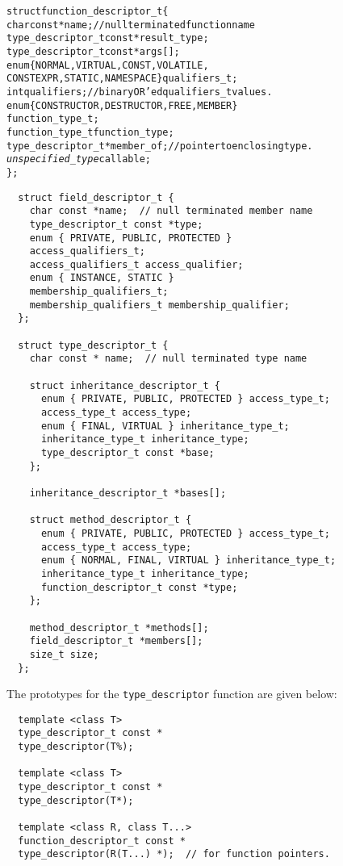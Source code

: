 \documentclass[10pt,a4paper]{article}
\begin{document}
\begin{alltt}
  struct function\_descriptor\_t \{
    char const *name;  // null terminated function name
    type\_descriptor\_t const *result\_type;
    type\_descriptor\_t const *args[];
    enum \{ NORMAL, VIRTUAL, CONST, VOLATILE,
           CONSTEXPR, STATIC, NAMESPACE \} qualifiers\_t;
    int qualifiers;  // binary OR’ed qualifiers\_t values.
    enum \{ CONSTRUCTOR, DESTRUCTOR, FREE, MEMBER \}
    function\_type\_t;
    function\_type\_t function\_type;
    type\_descriptor\_t *member\_of;  // pointer to enclosing type.
    \emph{unspecified\_type} callable;
  \};
\end{alltt}
\begin{verbatim}
  struct field_descriptor_t {
    char const *name;  // null terminated member name
    type_descriptor_t const *type;
    enum { PRIVATE, PUBLIC, PROTECTED }
    access_qualifiers_t;
    access_qualifiers_t access_qualifier;
    enum { INSTANCE, STATIC }
    membership_qualifiers_t;
    membership_qualifiers_t membership_qualifier;
  };

  struct type_descriptor_t {
    char const * name;  // null terminated type name

    struct inheritance_descriptor_t {
      enum { PRIVATE, PUBLIC, PROTECTED } access_type_t;
      access_type_t access_type;
      enum { FINAL, VIRTUAL } inheritance_type_t;
      inheritance_type_t inheritance_type;
      type_descriptor_t const *base;
    };

    inheritance_descriptor_t *bases[];

    struct method_descriptor_t {
      enum { PRIVATE, PUBLIC, PROTECTED } access_type_t;
      access_type_t access_type;
      enum { NORMAL, FINAL, VIRTUAL } inheritance_type_t;
      inheritance_type_t inheritance_type;
      function_descriptor_t const *type;
    };

    method_descriptor_t *methods[];
    field_descriptor_t *members[];
    size_t size;
  };
\end{verbatim}

The prototypes for the \verb+type_descriptor+ function are given below:

\begin{verbatim}
  template <class T>
  type_descriptor_t const *
  type_descriptor(T%);

  template <class T>
  type_descriptor_t const *
  type_descriptor(T*);

  template <class R, class T...>
  function_descriptor_t const *
  type_descriptor(R(T...) *);  // for function pointers.
\end{verbatim}
\end{document}
